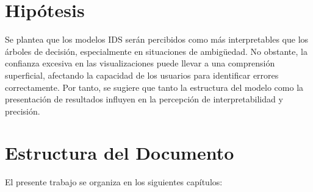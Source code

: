 \section{Hipótesis}

Se plantea que los modelos IDS serán percibidos como más interpretables que los árboles de decisión, especialmente en situaciones de ambigüedad. No obstante, la confianza excesiva en las visualizaciones puede llevar a una comprensión superficial, afectando la capacidad de los usuarios para identificar errores correctamente. Por tanto, se sugiere que tanto la estructura del modelo como la presentación de resultados influyen en la percepción de interpretabilidad y precisión.

\section{Estructura del Documento}

El presente trabajo se organiza en los siguientes capítulos:

